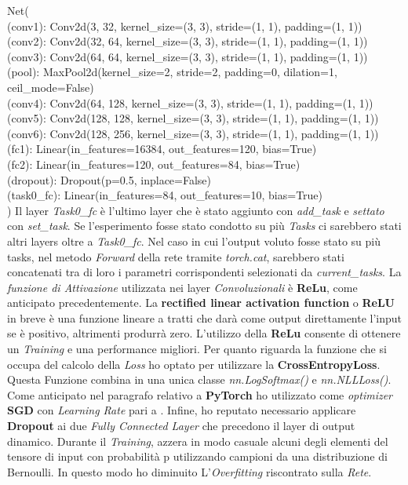 \newline
Net(\\
  (conv1): Conv2d(3, 32, kernel_size=(3, 3), stride=(1, 1), padding=(1, 1))\\
  (conv2): Conv2d(32, 64, kernel_size=(3, 3), stride=(1, 1), padding=(1, 1))\\
  (conv3): Conv2d(64, 64, kernel_size=(3, 3), stride=(1, 1), padding=(1, 1))\\
  (pool): MaxPool2d(kernel_size=2, stride=2, padding=0, dilation=1, ceil_mode=False)\\
  (conv4): Conv2d(64, 128, kernel_size=(3, 3), stride=(1, 1), padding=(1, 1))\\
  (conv5): Conv2d(128, 128, kernel_size=(3, 3), stride=(1, 1), padding=(1, 1))\\
  (conv6): Conv2d(128, 256, kernel_size=(3, 3), stride=(1, 1), padding=(1, 1))\\
  (fc1): Linear(in_features=16384, out_features=120, bias=True)\\
  (fc2): Linear(in_features=120, out_features=84, bias=True)\\
  (dropout): Dropout(p=0.5, inplace=False)\\
  (task0\_fc): Linear(in_features=84, out_features=10, bias=True)\\
)
\newpage
Il layer \textit{Task0\_fc} è l'ultimo layer che è stato aggiunto con \textit{add\_task} e \textit{settato} con \textit{set\_task}.
Se l'esperimento fosse stato condotto su più \textit{Tasks} ci sarebbero stati altri layers oltre a \textit{Task0\_fc}. Nel caso in cui l'output voluto fosse stato su più tasks, nel metodo \textit{Forward} della rete tramite \textit{torch.cat}, sarebbero stati concatenati tra di loro i parametri corrispondenti selezionati da \textit{current\_tasks}.
\newline
La \textit{funzione di Attivazione} utilizzata nei layer \textit{Convoluzionali} è \textbf{ReLu}, come anticipato precedentemente.
La \textbf{rectified linear activation function} o \textbf{ReLU} in breve è una funzione lineare a tratti che darà  come output direttamente l'input se è positivo, altrimenti produrrà zero. L'utilizzo della \textbf{ReLu} consente di ottenere un \textit{Training} e una performance migliori.
\newline
Per quanto riguarda la funzione che si occupa del calcolo della \textit{Loss} ho optato per utilizzare la \textbf{CrossEntropyLoss}. Questa Funzione combina in una unica classe \textit{nn.LogSoftmax()} e \textit{ nn.NLLLoss()}.
Come anticipato nel paragrafo relativo a \textbf{PyTorch} ho utilizzato come \textit{optimizer} \textbf{SGD} con \textit{Learning Rate} pari a  .\newline
Infine, ho reputato necessario applicare \textbf{Dropout} ai due \textit{Fully Connected Layer} che precedono il layer di output dinamico. Durante il \textit{Training}, azzera in modo casuale alcuni degli elementi del tensore di input con probabilità p utilizzando campioni da una distribuzione di Bernoulli. In questo modo ho diminuito L'\textit{Overfitting}  riscontrato sulla \textit{Rete}.